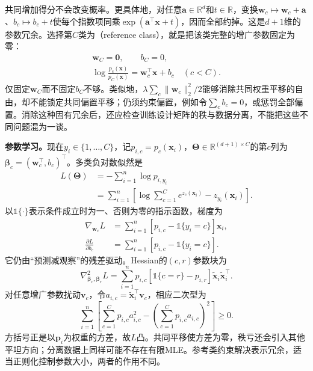 共同增加得分不会改变概率。更具体地，对任意$\bm{a}\in\mathbb{R}^{d}$和$t\in\mathbb{R}$，变换$\bm{w}_c\mapsto\bm{w}_c+\bm{a}$、$b_c\mapsto b_c+t$使每个指数项同乘$\exp(\bm{a}^{\top}\bm{x}+t)$，因而全部约掉。这是$d+1$维的参数冗余。选择第$C$类为（reference class），就是把该类完整的增广参数固定为零：
\begin{equation}
  \label{eq:classification-softmax-reference}
  \begin{gathered}
    \bm{w}_C=\bm{0},\qquad b_C=0,\\
    \log\frac{p_c(\bm{x})}{p_C(\bm{x})}
    =\bm{w}_c^{\top}\bm{x}+b_c
    \quad(c<C).
  \end{gathered}
\end{equation}
仅固定$\bm{w}_C$而不固定$b_C$不够。类似地，$\lambda\sum_c\lVert\bm{w}_c\rVert_2^2/2$能够消除共同权重平移的自由，却不能锁定共同偏置平移；仍须约束偏置，例如令$\sum_c b_c=0$，或惩罚全部偏置。消除这种固有冗余后，还应检查训练设计矩阵的秩与数据分离，不能把这些不同问题混为一谈。

\textbf{参数学习。}现在$y_i\in\{1,\ldots,C\}$，记$p_{i,c}=p_c(\bm{x}_i)$，$\bm{\Theta}\in\mathbb{R}^{(d+1)\times C}$的第$c$列为$\bm{\beta}_c=(\bm{w}_c^{\top},b_c)^{\top}$。多类负对数似然是
\begin{equation}
  \label{eq:classification-softmax-loss}
  \begin{aligned}
    L(\bm{\Theta})
      &=-\sum_{i=1}^{n}\log p_{i,y_i}\\
      &=\sum_{i=1}^{n}\left[
        \log\sum_{c=1}^{C}e^{z_c(\bm{x}_i)}
        -z_{y_i}(\bm{x}_i)\right].
  \end{aligned}
\end{equation}
以$\mathbb{1}\{\cdot\}$表示条件成立时为一、否则为零的指示函数，梯度为
\begin{equation}
  \label{eq:classification-softmax-gradient}
  \begin{aligned}
    \nabla_{\bm{w}_c}L
      &=\sum_{i=1}^{n}
        [p_{i,c}-\mathbb{1}\{y_i=c\}]\bm{x}_i,\\
    \frac{\partial L}{\partial b_c}
      &=\sum_{i=1}^{n}
        [p_{i,c}-\mathbb{1}\{y_i=c\}].
  \end{aligned}
\end{equation}
它仍由“预测减观察”的残差驱动。Hessian的$(c,r)$参数块为
\[
  \nabla^2_{\bm{\beta}_c,\bm{\beta}_r}L
  =\sum_{i=1}^{n}p_{i,c}
    [\mathbb{1}\{c=r\}-p_{i,r}]
    \tilde{\bm{x}}_i\tilde{\bm{x}}_i^{\top}.
\]
对任意增广参数扰动$\bm{v}_c$，令$a_{i,c}=\tilde{\bm{x}}_i^{\top}\bm{v}_c$，相应二次型为
\[
  \sum_{i=1}^{n}\left[
    \sum_{c=1}^{C}p_{i,c}a_{i,c}^2
    -\left(\sum_{c=1}^{C}p_{i,c}a_{i,c}\right)^2
  \right]\geq0.
\]
方括号正是以$\bm{p}_i$为权重的方差，故$L$凸。共同平移使方差为零，秩亏还会引入其他平坦方向；分离数据上同样可能不存在有限MLE。参考类约束解决表示冗余，适当正则化控制参数大小，两者的作用不同。

